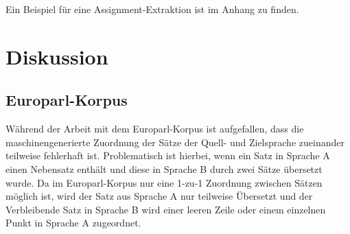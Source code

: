 \documentclass[conference]{IEEEtran}
\begin{document}
Ein Beispiel für eine Assignment-Extraktion ist im Anhang zu finden.




\section{Diskussion}
\subsection{Europarl-Korpus}
\label{korpusprobleme}
Während der Arbeit mit dem Europarl-Korpus ist aufgefallen, dass die maschinengenerierte Zuordnung der Sätze der Quell- und Zielsprache zueinander teilweise fehlerhaft ist.
Problematisch ist hierbei, wenn ein Satz in Sprache A einen Nebensatz enthält und diese in Sprache B durch zwei Sätze übersetzt wurde.
Da im Europarl-Korpus nur eine 1-zu-1 Zuordnung zwischen Sätzen möglich ist, wird der Satz aus Sprache A nur teilweise Übersetzt und der Verbleibende Satz in Sprache B wird einer leeren Zeile oder einem einzelnen Punkt in Sprache A zugeordnet.
\end{document}
